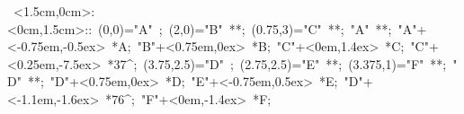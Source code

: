 
%

\hbox{
\xy    <1.5cm,0cm>:<0cm,1.5cm>::
       (0,0)="A" ; (2,0)="B" **\dir{-};
       (0.75,3)="C" **\dir{-}; "A" **\dir{-};
       "A"+<-0.75em,-0.5ex> *{A};
       "B"+<0.75em,0ex> *{B};
       "C"+<0em,1.4ex> *{C};
       "C"+<0.25em,-7.5ex> *{37^\circ};
       (3.75,2.5)="D" ; (2.75,2.5)="E" **\dir{-}; 
       (3.375,1)="F" **\dir{-}; "D" **\dir{-};
       "D"+<0.75em,0ex> *{D};
       "E"+<-0.75em,0.5ex> *{E};
       "D"+<-1.1em,-1.6ex> *{76^\circ};
       "F"+<0em,-1.4ex> *{F};
       \endxy}
	   
